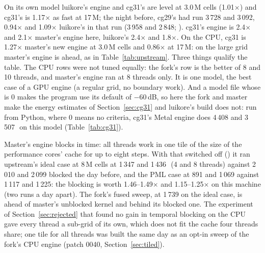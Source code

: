 On its own model luikore's engine and cg31's are level at 3.0\,M cells (1.01$\times$) and cg31's is 1.17$\times$ as
fast at 17\,M; the night before, cg29's had run 3\,728 and 3\,092, 0.94$\times$ and 1.09$\times$ luikore's in that
run (3\,958 and 2\,848; ). cg31's engine is 2.4$\times$ and
2.1$\times$ master's  engine here, luikore's 2.4$\times$ and 1.8$\times$.
On the CPU, cg31 is 1.27$\times$ master's new  engine at 3.0\,M cells and 0.86$\times$ at 17\,M: on the large
grid master's engine is ahead, as in Table~\ref{tab:upstream}. Three things qualify the table. The CPU rows were not tuned equally: the fork's row is the better of 8 and 10 threads,
and master's  engine ran at 8 threads only. It is one model, the best
case of a GPU engine (a regular grid, no boundary work). And a model file whose  is 0 makes the
 program use its default of $-60$\,dB, so here the fork and master make the energy estimates of
Section~\ref{sec:cg31} and luikore's build does not: run from Python, where 0 means no criteria, cg31's Metal engine
does 4\,408 and 3\,507\,\MC\ on this model (Table~\ref{tab:cg31}).

Master's  engine blocks in time: all threads work in one tile of the size of the performance cores' cache
for up to eight steps. With that switched off () it ran upstream's ideal case at 8\,M
cells at 1\,347 and 1\,436\,\MC\ (4 and 8 threads) against 2\,010 and 2\,099 blocked the day before, and the PML case
at 891 and 1\,069 against 1\,117 and 1\,225: the blocking is worth 1.46--1.49$\times$ and 1.15--1.25$\times$ on this
machine (two runs a day apart). The fork's fused sweep, at 1\,739 on the ideal case, is ahead of master's unblocked
kernel and behind its blocked one. The experiment of Section~\ref{sec:rejected} that found no gain in temporal blocking
on the CPU gave every thread a sub-grid of its own, which does not fit the cache four threads share; one tile for
all threads was built the same day as an opt-in sweep of the fork's CPU engine (patch 0040, Section~\ref{sec:tiled}).

